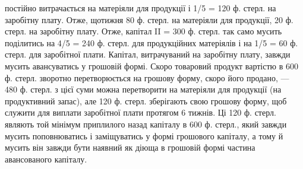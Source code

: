 \parcont{}  %
постійно витрачається на матеріяли для продукції і 1/5 = 120 ф. стерл.
на заробітну плату. Отже, щотижня 80 ф. стерл. на матеріяли для продукції,
20 ф. стерл. на заробітну плату. Отже, капітал II = 300 ф. стерл.
так само мусить поділитись на 4/5 = 240 ф. стерл. для продукційних матеріялів
і на 1/5 = 60 ф. стерл. для заробітної плати. Капітал, витрачуваний
на заробітну плату, завжди мусить авансуватись у грошовій формі.
Скоро товаровий продукт вартістю в 600 ф. стерл. зворотно перетворюється
на грошову форму, скоро його продано, — 480 ф. стерл. з цієї
суми можна перетворити на матеріяли для продукції (на продуктивний
запас), але 120 ф. стерл. зберігають свою грошову форму, щоб служити
для виплати заробітної плати протягом 6 тижнів. Ці 120 ф. стерл. являють
той мінімум приплилого назад капіталу в 600 ф. стерл., який завжди
мусить поповнюватись і заміщуватись у формі грошового капіталу, а
тому й мусить він завжди бути наявний як діюща в грошовій формі частина
авансованого капіталу.

